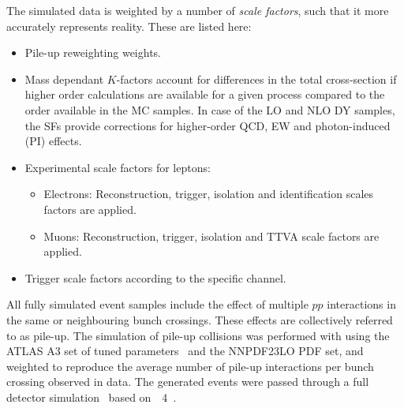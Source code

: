 The simulated data is weighted by a number of \emph{scale factors}, such that it more accurately represents reality.
These are listed here:
\begin{itemize}
	\item Pile-up reweighting weights.
	\item Mass dependant $K$-factors account for differences in the total cross-section if higher order calculations are available for a given process compared to the order available in the MC samples. In case of the LO and NLO DY samples, the SFs provide corrections for higher-order QCD, EW and photon-induced (PI) effects.
	\item Experimental scale factors for leptons:
	\begin{itemize}
		\item Electrons: Reconstruction, trigger, isolation and identification scales factors are applied.
		\item Muons: Reconstruction, trigger, isolation and TTVA scale factors are applied.
	\end{itemize}
	\item Trigger scale factors according to the specific channel.
\end{itemize}

All fully simulated event samples include the effect of multiple $pp$ interactions in the same or neighbouring bunch crossings.
These effects are collectively referred to as pile-up.
The simulation of pile-up collisions was performed with  using the ATLAS A3 set of tuned parameters~\cite{ATL-PHYS-PUB-2016-017} and the NNPDF23LO PDF set, and weighted to reproduce the average number of pile-up interactions per bunch crossing observed in data.
The generated events were passed through a full detector simulation~\cite{SOFT-2010-01} based on\ \GEANT~4~\cite{geant}.

